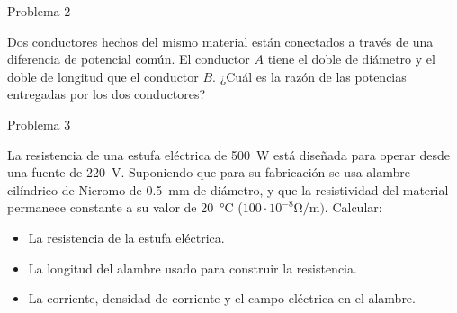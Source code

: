 \documentclass[10pt, aspectratio=169]{beamer}
\begin{document}
\begin{frame}{Problema 2}

    Dos conductores hechos del mismo material están conectados a través de una diferencia de potencial común. El conductor $A$ tiene el doble de diámetro y el doble de longitud que el conductor $B$. ¿Cuál es la razón de las potencias entregadas por los dos conductores?

\end{frame}

\begin{frame}{Problema 3}

    La resistencia de una estufa eléctrica de \qty{500}{\W} está diseñada para operar desde una fuente de \qty{220}{\V}. Suponiendo que para su fabricación se usa alambre cilíndrico de Nicromo de \qty{0.5}{\mm} de diámetro, y que la resistividad del material permanece constante a su valor de \qty{20}{\degreeCelsius} ($100\cdot 10^{-8} \unit{\ohm\per\meter})$. Calcular:

    \begin{itemize}
        \item La resistencia de la estufa eléctrica.
        \item La longitud del alambre usado para construir la resistencia.
        \item La corriente, densidad de corriente y el campo eléctrica en el alambre.
    \end{itemize}
\end{frame}
\end{document}
